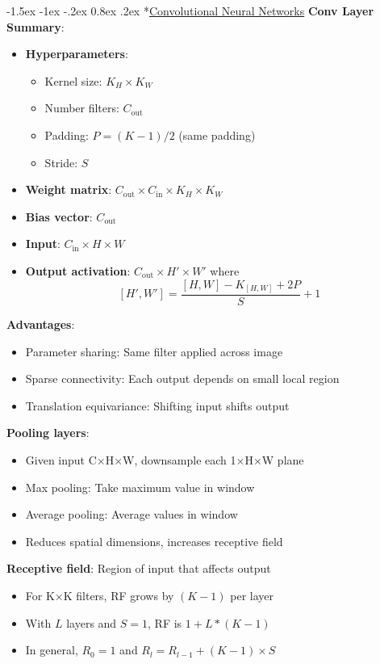 \documentclass{article}
\makeatletter
\renewcommand\section{\@startsection{section}{1}{\z@}%
                                  {-1.5ex \@plus -1ex \@minus -.2ex}%
                                  {0.8ex \@plus.2ex}%
                                  {\normalfont\small\bfseries}}
\makeatother
\begin{document}
\begin{multicols}{3}
\section*{\underline{Convolutional Neural Networks}}
\textbf{Conv Layer Summary}:
\begin{itemize}
\item \textbf{Hyperparameters}:
\begin{itemize}
\item Kernel size: $K_H \times K_W$
\item Number filters: $C_{\text{out}}$
\item Padding: $P = (K-1)/2$ (same padding)
\item Stride: $S$
\end{itemize}
\item \textbf{Weight matrix}: $C_{\text{out}} \times C_{\text{in}} \times K_H \times K_W$
\item \textbf{Bias vector}: $C_{\text{out}}$
\item \textbf{Input}: $C_{\text{in}} \times H \times W$
\item \textbf{Output activation}: $C_{\text{out}} \times H' \times W'$ where
$$
[H', W'] = \frac{[H, W] - K_{[H, W]} + 2P}{S} + 1
$$
\end{itemize}

\textbf{Advantages}:
\begin{itemize}
\item Parameter sharing: Same filter applied across image
\item Sparse connectivity: Each output depends on small local region
\item Translation equivariance: Shifting input shifts output
\end{itemize}

\textbf{Pooling layers}: 
\begin{itemize}
\item Given input C×H×W, downsample each 1×H×W plane
\item Max pooling: Take maximum value in window
\item Average pooling: Average values in window
\item Reduces spatial dimensions, increases receptive field
\end{itemize}

\textbf{Receptive field}: Region of input that affects output
\begin{itemize}
\item For K×K filters, RF grows by $(K-1)$ per layer
\item With $L$ layers and $S=1$, RF is $1 + L * (K - 1)$
\item In general, $R_0 = 1$ and $R_l = R_{l-1} + (K-1) \times S$
\end{itemize}


\end{multicols}
\end{document}
